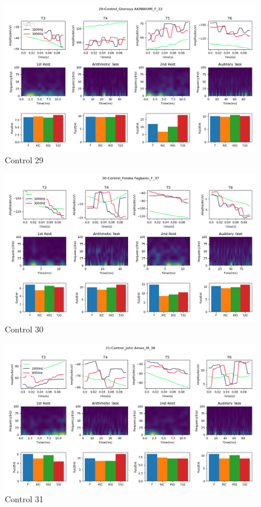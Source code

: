 \documentclass[conference]{IEEEconf}
\begin{document}
\clearpage
\begin{figure}
  \includegraphics[width=\textwidth]{../../data_analysis_results/results/Control/29.png}
  \caption{Control 29}
  \label{fig:control_29}
\end{figure}
\clearpage
\begin{figure}
  \includegraphics[width=\textwidth]{../../data_analysis_results/results/Control/30.png}
  \caption{Control 30}
  \label{fig:control_30}
\end{figure}
\clearpage
\begin{figure}
  \includegraphics[width=\textwidth]{../../data_analysis_results/results/Control/31.png}
  \caption{Control 31}
  \label{fig:control_31}
\end{figure}
\end{document}
